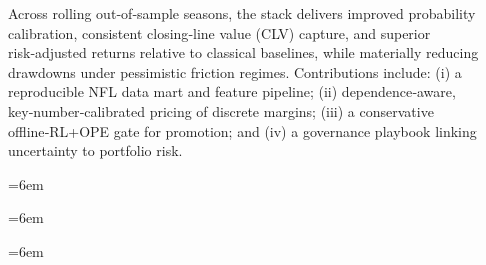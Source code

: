 \documentclass[12pt]{report}  %
\numberwithin{equation}{section}
\theoremstyle{plain}
\theoremstyle{definition}
\theoremstyle{remark}
\providecommand{\mainmatter}{\cleardoublepage\pagenumbering{arabic}}
\begin{document}
Across rolling out‑of‑sample seasons, the stack delivers improved probability calibration, consistent closing‑line value (CLV) capture, and superior risk‑adjusted returns relative to classical baselines, while materially reducing drawdowns under pessimistic friction regimes. Contributions include: (i) a reproducible NFL data mart and feature pipeline; (ii) dependence‑aware, key‑number‑calibrated pricing of discrete margins; (iii) a conservative offline‑RL+OPE gate for promotion; and (iv) a governance playbook linking uncertainty to portfolio risk.\par
{}

\cleardoublepage
{}
\begingroup\sloppy\RaggedRight\emergencystretch=6em
\tableofcontents
\endgroup

\cleardoublepage
{}
{}
\begingroup\sloppy\RaggedRight\emergencystretch=6em
\listoffigures
\endgroup

\cleardoublepage
{}
{}
\begingroup\sloppy\RaggedRight\emergencystretch=6em
\listoftables
\endgroup

\cleardoublepage
{}
{}

\hypersetup{pageanchor=true}
\mainmatter











\end{document}
